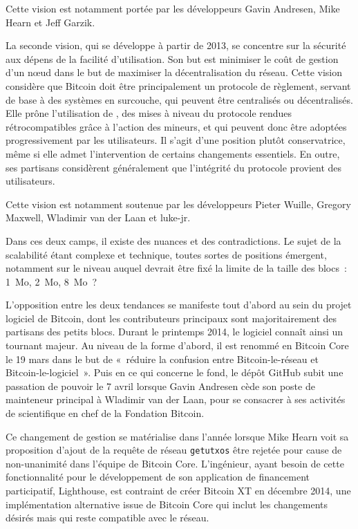 Cette vision est notamment portée par les développeurs Gavin Andresen, Mike Hearn et Jeff Garzik.

La seconde vision, qui se développe à partir de 2013\sendnote{}, se concentre sur la sécurité aux dépens de la facilité d'utilisation. Son but est minimiser le coût de gestion d'un nœud dans le but de maximiser la décentralisation du réseau. Cette vision considère que Bitcoin doit être principalement un protocole de règlement, servant de base à des systèmes en surcouche, qui peuvent être centralisés ou décentralisés. Elle prône l'utilisation de , des mises à niveau du protocole rendues rétrocompatibles grâce à l'action des mineurs, et qui peuvent donc être adoptées progressivement par les utilisateurs. Il s'agit d'une position plutôt conservatrice, même si elle admet l'intervention de certains changements essentiels. En outre, ses partisans considèrent généralement que l'intégrité du protocole provient des utilisateurs.  %

Cette vision est notamment soutenue par les développeurs Pieter Wuille, Gregory Maxwell, Wladimir van der Laan et luke-jr.

Dans ces deux camps, il existe des nuances et des contradictions. Le sujet de la scalabilité étant complexe et technique, toutes sortes de positions émergent, notamment sur le niveau auquel devrait être fixé la limite de la taille des blocs~: 1~Mo, 2~Mo, 8~Mo~?

L'opposition entre les deux tendances se manifeste tout d'abord au sein du projet logiciel de Bitcoin, dont les contributeurs principaux sont majoritairement des partisans des petits blocs. Durant le printemps 2014, le logiciel connaît ainsi un tournant majeur. Au niveau de la forme d'abord, il est renommé en Bitcoin Core le 19 mars dans le but de «~réduire la confusion entre Bitcoin-le-réseau et Bitcoin-le-logiciel~». Puis en ce qui concerne le fond, le dépôt GitHub subit une passation de pouvoir le 7 avril lorsque Gavin Andresen cède son poste de mainteneur principal à Wladimir van der Laan, pour se consacrer à ses activités de scientifique en chef de la Fondation Bitcoin.

Ce changement de gestion se matérialise dans l'année lorsque Mike Hearn voit sa proposition d'ajout de la requête de réseau \texttt{getutxos} être rejetée pour cause de non-unanimité dans l'équipe de Bitcoin Core. L'ingénieur, ayant besoin de cette fonctionnalité pour le développement de son application de financement participatif, Lighthouse, est contraint de créer Bitcoin XT en décembre 2014, une implémentation alternative issue de Bitcoin Core qui inclut les changements désirés mais qui reste compatible avec le réseau.


